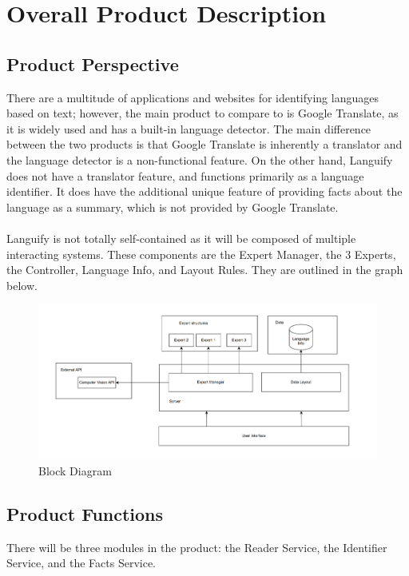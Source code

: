 \section{Overall Product Description}
\label{sec:overall_description}


\subsection{Product Perspective}
\label{sub:product_perspective}
There are a multitude of applications and websites for identifying languages based on text; however, the main product to compare to is Google Translate, 
as it is widely used and has a built-in language detector. The main difference between the two products is that Google Translate is inherently a translator
and the language detector is a non-functional feature. On the other hand, Languify does not have a translator feature, and functions primarily as a language identifier.
It does have the additional unique feature of providing facts about the language as a summary, which is not provided by Google Translate. \\ \\
Languify is not totally self-contained as it will be composed of multiple interacting systems. These components are the Expert Manager, the 3 Experts, 
the Controller, Language Info, and Layout Rules. They are outlined in the graph below.

\begin{figure}[H]
	\centering
	\includegraphics{Section2/Block_Diagram.png}
	\caption{Block Diagram}
	\label{BlockDiagram}
\end{figure}

\subsection{Product Functions}
\label{sub:product_functions}
There will be three modules in the product: the Reader Service, the Identifier Service, and the Facts Service.

